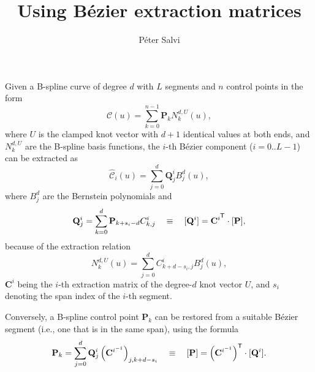 \documentclass{article}
\begin{document}
\title{Using B\'ezier extraction matrices}
\author{P\'eter Salvi}
\maketitle
Given a B-spline curve of degree $d$ with $L$ segments and $n$ control points in the form
\[\mathcal{C}(u)=\sum_{k=0}^{n-1}\mathbf{P}_kN_k^{d,U}(u),\]
where $U$ is the clamped knot vector with $d+1$ identical values at both ends,
and $N_k^{d,U}$ are the B-spline basis functions, the $i$-th B\'ezier component ($i=0..L-1$)
can be extracted as
\[\hat{\mathcal{C}}_i(u)=\sum_{j=0}^d\mathbf{Q}_j^iB_j^d(u),\]
where $B_j^d$ are the Bernstein polynomials and
\[\mathbf{Q}_j^i=\sum_{k=0}^d\mathbf{P}_{k+s_i-d}C^i_{k,j}\quad\equiv\quad
         [\mathbf{Q}^i]=\mathbf{C}^{i^\textsf{\scriptsize T}}\cdot[\mathbf{P}],\]
because of the extraction relation
\[N_k^{d,U}(u)=\sum_{j=0}^dC^i_{k+d-s_i,j}B_j^d(u),\]
$\mathbf{C}^i$ being the $i$-th extraction matrix of the degree-$d$ knot vector $U$,
and $s_i$ denoting the span index of the $i$-th segment.

Conversely, a B-spline control point $\mathbf{P}_k$ can be restored from a
suitable B\'ezier segment (i.e., one that is in the same span), using the formula
\[\mathbf{P}_k=\sum_{j=0}^d\mathbf{Q}_j^i\left(\mathbf{C}^{i^{-1}}\right)_{j,k+d-s_i}
\quad\equiv\quad
[\mathbf{P}]=\left(\mathbf{C}^{i^{-1}}\right)^\textsf{\scriptsize T}\cdot[\mathbf{Q}^i].\]
\end{document}
